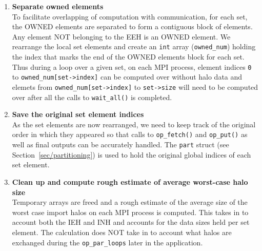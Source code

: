 \documentclass[12pt]{article}
\begin{document}
\begin{enumerate}
\item \textbf{Separate owned elements}\\
To facilitate overlapping of computation with communication, for each set, the OWNED elements are separated to form a
contiguous block of elements. Any element NOT belonging to the EEH is an OWNED element. We rearrange the local set
elements and create an \texttt{int} array (\texttt{owned\_num}) holding the index that marks the end of the OWNED
elements block for each set. Thus during a loop over a given set, on each MPI process, element indices \texttt{0} to
\texttt{owned\_num[set->index]} can be computed over without halo data and elemets from \texttt{owned\_num[set->index]}
to \texttt{set->size} will need to be computed over after all the calls to \texttt{wait\_all()} is completed.

\item \textbf{Save the original set element indices}\\
As the set elements are now rearranged, we need to keep track of the original order in which they appeared so that
calls to \texttt{op\_fetch()} and \texttt{op\_put()} as well as final outputs can be accurately handled. The
\texttt{part} struct (see Section~\ref{sec/partitioning}) is used to hold the original global indices of each set
element.


\item \textbf{Clean up and compute rough estimate of average worst-case halo size}\\
Temporary arrays are freed and a rough estimate of the average size of the worst case import halos on each MPI process
is computed. This takes in to account both the IEH and INH and accounts for the data sizes held per set element. The
calculation does NOT take in to account what halos are exchanged during the \texttt{op\_par\_loops} later in the
application. 
\end{enumerate}

\newpage
\end{document}
